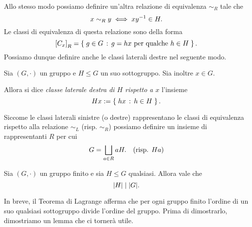 Allo stesso modo possiamo definire un'altra relazione di equivalenza $\sim_R$ tale che \[
    x \sim_R y \iff xy^{-1} \in H.    
\] Le classi di equivalenza di questa relazione sono della forma \[
    \eqclass*{x}_R = \set{g \in G \suchthat g = hx \text{ per qualche } h \in H}.    
\] Possiamo dunque definire anche le classi laterali destre nel seguente modo.
\begin{definition}
    Sia $(G, \cdot)$ un gruppo e $H \leq G$ un suo sottogruppo. Sia inoltre $x \in G$.
    
    Allora si dice \emph{classe laterale destra di $H$ rispetto a $x$} l'insieme \[
        Hx := \left\{\;hx \,:\, h \in H\;\right\}. 
    \]
\end{definition}

\begin{remark}
    Siccome le classi laterali sinistre (o destre) rappresentano le classi di equivalenza rispetto alla relazione $\sim_L$ (risp. $\sim_R$) possiamo definire un insieme di rappresentanti $R$ per cui \begin{equation}
        G = \bigsqcup_{a \in R} aH. \quad \text{(risp. $Ha$)}
    \end{equation}
\end{remark}

\begin{theorem}
     \label{th:lagrange}
    Sia $(G, \cdot)$ un gruppo finito e sia $H \leq G$ qualsiasi. Allora vale che \[
        \abs*{H} \divides \abs*{G}.    
    \]
\end{theorem}

In breve, il Teorema di Lagrange afferma che per ogni gruppo finito l'ordine di un suo qualsiasi sottogruppo divide l'ordine del gruppo. Prima di dimostrarlo, dimostriamo un lemma che ci tornerà utile.

